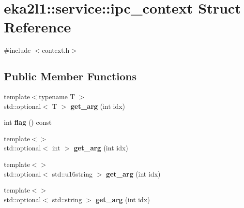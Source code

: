 \hypertarget{structeka2l1_1_1service_1_1ipc__context}{}\section{eka2l1\+:\+:service\+:\+:ipc\+\_\+context Struct Reference}
\label{structeka2l1_1_1service_1_1ipc__context}


{\ttfamily \#include $<$context.\+h$>$}

\subsection*{Public Member Functions}
\begin{DoxyCompactItemize}
\item 
\mbox{\label{structeka2l1_1_1service_1_1ipc__context_aa126ccd6581eb3ae03338b35f1769546}} 
{\footnotesize template$<$typename T $>$ }\\std\+::optional$<$ T $>$ {\bfseries get\+\_\+arg} (int idx)
\item 
\mbox{\label{structeka2l1_1_1service_1_1ipc__context_a88f061f4d6060935e53c2e3f2846ad39}} 
int {\bfseries flag} () const
\item 
\mbox{\label{structeka2l1_1_1service_1_1ipc__context_a12fc0d26811dbd5aad9674f0e5bf2bc3}} 
{\footnotesize template$<$$>$ }\\std\+::optional$<$ int $>$ {\bfseries get\+\_\+arg} (int idx)
\item 
\mbox{\label{structeka2l1_1_1service_1_1ipc__context_a6d31d89e6b787cf315733601d1b2b503}} 
{\footnotesize template$<$$>$ }\\std\+::optional$<$ std\+::u16string $>$ {\bfseries get\+\_\+arg} (int idx)
\item 
\mbox{\label{structeka2l1_1_1service_1_1ipc__context_a43a8df55855a709757d776908e5e4e15}} 
{\footnotesize template$<$$>$ }\\std\+::optional$<$ std\+::string $>$ {\bfseries get\+\_\+arg} (int idx)
\end{DoxyCompactItemize}

